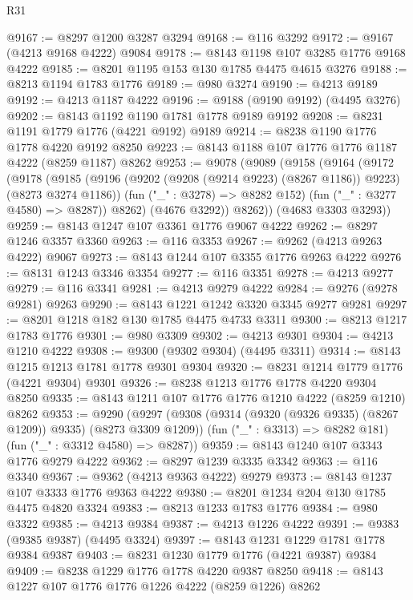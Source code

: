 \begin{lexlean}{R31}
\begin{coremodule}
@9167 := @8297 @1200 @3287 @3294
@9168 := @116 @3292
@9172 := @9167 (@4213 @9168 @4222) @9084
@9178 := @8143 @1198 @107 @3285 @1776 @9168 @4222
@9185 := @8201 @1195 @153 @130 @1785 @4475 @4615 @3276
@9188 := @8213 @1194 @1783 @1776
@9189 := @980 @3274
@9190 := @4213 @9189
@9192 := @4213 @1187 @4222
@9196 := @9188 (@9190 @9192) (@4495 @3276)
@9202 := @8143 @1192 @1190 @1781 @1778 @9189 @9192
@9208 := @8231 @1191 @1779 @1776 (@4221 @9192) @9189
@9214 := @8238 @1190 @1776 @1778 @4220 @9192 @8250
@9223 := @8143 @1188 @107 @1776 @1776 @1187 @4222 (@8259 @1187) @8262
@9253 := @9078
    (@9089
      (@9158
        (@9164
          (@9172
            (@9178
              (@9185
                (@9196 (@9202 (@9208 (@9214 @9223) (@8267 @1186)) @9223) (@8273 @3274 @1186))
                (fun ("_" : @3278) => @8282 @152)
                (fun ("_" : @3277 @4580) => @8287))
              @8262)
            (@4676 @3292))
          @8262))
      (@4683 @3303 @3293))
@9259 := @8143 @1247 @107 @3361 @1776 @9067 @4222
@9262 := @8297 @1246 @3357 @3360
@9263 := @116 @3353
@9267 := @9262 (@4213 @9263 @4222) @9067
@9273 := @8143 @1244 @107 @3355 @1776 @9263 @4222
@9276 := @8131 @1243 @3346 @3354
@9277 := @116 @3351
@9278 := @4213 @9277
@9279 := @116 @3341
@9281 := @4213 @9279 @4222
@9284 := @9276 (@9278 @9281) @9263
@9290 := @8143 @1221 @1242 @3320 @3345 @9277 @9281
@9297 := @8201 @1218 @182 @130 @1785 @4475 @4733 @3311
@9300 := @8213 @1217 @1783 @1776
@9301 := @980 @3309
@9302 := @4213 @9301
@9304 := @4213 @1210 @4222
@9308 := @9300 (@9302 @9304) (@4495 @3311)
@9314 := @8143 @1215 @1213 @1781 @1778 @9301 @9304
@9320 := @8231 @1214 @1779 @1776 (@4221 @9304) @9301
@9326 := @8238 @1213 @1776 @1778 @4220 @9304 @8250
@9335 := @8143 @1211 @107 @1776 @1776 @1210 @4222 (@8259 @1210) @8262
@9353 := @9290
    (@9297
      (@9308 (@9314 (@9320 (@9326 @9335) (@8267 @1209)) @9335) (@8273 @3309 @1209))
      (fun ("_" : @3313) => @8282 @181)
      (fun ("_" : @3312 @4580) => @8287))
@9359 := @8143 @1240 @107 @3343 @1776 @9279 @4222
@9362 := @8297 @1239 @3335 @3342
@9363 := @116 @3340
@9367 := @9362 (@4213 @9363 @4222) @9279
@9373 := @8143 @1237 @107 @3333 @1776 @9363 @4222
@9380 := @8201 @1234 @204 @130 @1785 @4475 @4820 @3324
@9383 := @8213 @1233 @1783 @1776
@9384 := @980 @3322
@9385 := @4213 @9384
@9387 := @4213 @1226 @4222
@9391 := @9383 (@9385 @9387) (@4495 @3324)
@9397 := @8143 @1231 @1229 @1781 @1778 @9384 @9387
@9403 := @8231 @1230 @1779 @1776 (@4221 @9387) @9384
@9409 := @8238 @1229 @1776 @1778 @4220 @9387 @8250
@9418 := @8143 @1227 @107 @1776 @1776 @1226 @4222 (@8259 @1226) @8262

\end{coremodule}
\end{lexlean}
